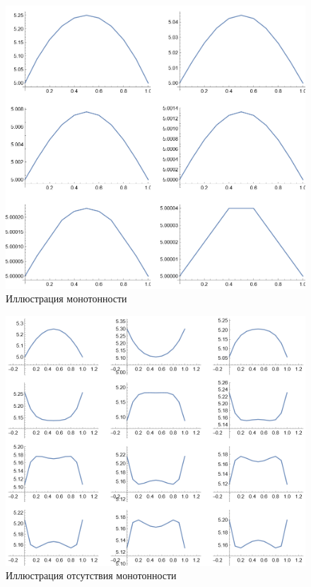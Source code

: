 \documentclass[12pt, a4paper]{article}
\begin{document}
\begin{enumerate}
		\begin{figure}[!h]
			\centering
			\includegraphics[width=0.9\linewidth]{with_mono}
			\caption{Иллюстрация монотонности}
			\label{with_mono}
		\end{figure}
		
		\begin{figure}[!h]
			\centering
			\includegraphics[width=0.9\linewidth]{without_mono}
			\caption{Иллюстрация отсутствия монотонности}
			\label{without_mono}
		\end{figure}
		

\end{enumerate}
\end{document}
